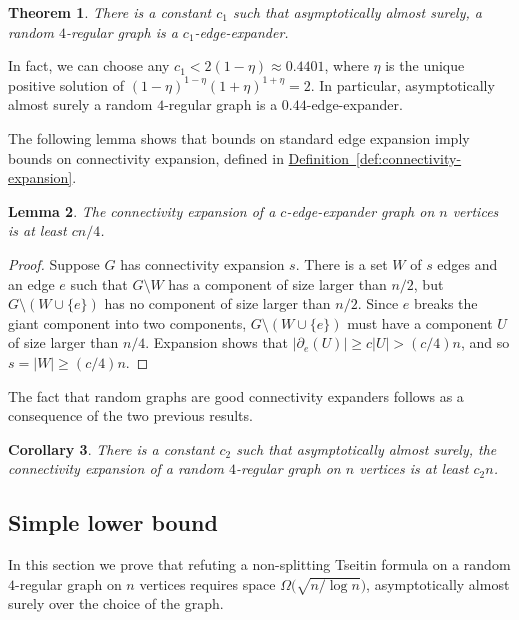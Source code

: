 \documentclass[11pt]{article}
\numberwithin{equation}{section}
\newtheorem{theorem}{Theorem}[section]
\newtheorem{lemma}[theorem]{Lemma}
\newtheorem{corollary}[theorem]{Corollary}
\theoremstyle{definition}
\theoremstyle{plain}
\newcommand{\expref}[2]{\hyperref[#2]{#1~\ref{#2}}}
\theoremstyle{plain}
\theoremstyle{definition}
\newcommand{\Bigomega}[1]{\Omega \bigl( #1 \bigr)}
\newcommand{\Gnonsplittingnot}{non-splitting\xspace}
\newcommand{\Gnonsplitting}{\Gnonsplittingnot}
\newcommand{\edgeboundary}[1]{\partial_e(#1)}
\begin{document}
%
%

\begin{theorem} \label{thm:expander}
There is a constant $c_1$ such that asymptotically almost surely, a random $4$-regular graph
is a $c_1$-edge-expander.
\end{theorem}

In fact, we can choose any $c_1 < 2(1-\eta) \approx 0.4401$, where $\eta$ is the unique positive solution of $(1-\eta)^{1-\eta} (1+\eta)^{1+\eta} = 2$. In particular, asymptotically almost surely a random $4$-regular graph is a $0.44$-edge-expander.

%
The following lemma shows that bounds on standard edge expansion imply bounds on connectivity expansion, defined in \expref{Definition}{def:connectivity-expansion}.

%
%
%
%
%
%

%
%
%
%
%
%
\begin{lemma} \label{lem:edge-to-connectivity}
  The connectivity expansion of a $c$-edge-expander graph on $n$ vertices is at least $cn/4$.
\end{lemma}
\begin{proof}
  Suppose $G$ has connectivity expansion $s$. There is a set $W$ of $s$ edges and an edge $e$ such that $G \setminus W$ has a component of size larger than $n/2$, but $G \setminus (W \cup \{e\})$ has no component of size larger than $n/2$. Since $e$ breaks the giant component into two components, $G \setminus (W \cup \{e\})$ must have a component $U$ of size larger than $n/4$. Expansion shows that
$|\edgeboundary{U}| \geq c |U| > (c/4) n$, and so $s = |W| \geq (c/4) n$.
\end{proof}

The fact that random graphs are good connectivity expanders follows as a consequence of the two previous results.
\begin{corollary}
\label{cor:splitting}
There is a constant $c_2$ such that asymptotically almost surely, the connectivity expansion
of a random $4$-regular graph on $n$ vertices is at least $c_2n$.
\end{corollary}

\subsection{Simple lower bound} \label{sec:simple}

In this section we prove that refuting a \Gnonsplitting Tseitin formula on a random $4$-regular graph on $n$ vertices requires space $\Bigomega{\sqrt{n/\log n}}$, asymptotically almost surely over the choice of the graph.
\end{document}
